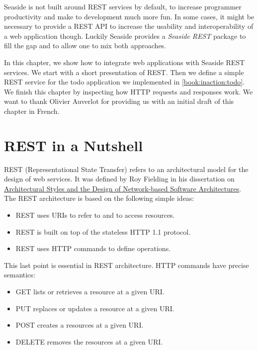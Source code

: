 \documentclass[a4paper,10pt,twoside]{book}
\begin{document}
 Seaside is not built around REST services by default, to increase programmer productivity and make to development much more fun. In some cases, it might be necessary to provide a REST API to increase the usability and interoperability of a web application though. Luckily Seaside provides a \textit{Seaside REST} package to fill the gap and to allow one to mix both approaches.

In this chapter, we show how to integrate web applications with Seaside REST services. We start with a short presentation of REST. Then we define a simple REST service for the todo application we implemented in \autoref{book:inaction:todo}. We finish this chapter by inspecting how HTTP requests and responses work. We want to thank Olivier Auverlot for providing us with an initial draft of this chapter in French.

\section{REST in a Nutshell}
\label{book:advanced:restful:nutshell}

REST (Representational State Transfer) refers to an architectural model for the design of web services. It was defined by Roy Fielding in his dissertation on \href{http://www.ics.uci.edu/~fielding/pubs/dissertation/rest_arch_style.htm}{Architectural Styles and the Design of Network-based Software Architectures}. The REST architecture is based on the following simple ideas:

\begin{itemize}
\item  REST uses URIs to refer to and to access resources.
\item  REST is built on top of the stateless HTTP 1.1 protocol. 
\item  REST uses HTTP commands to define operations.
\end{itemize}

This last point is essential in REST architecture. HTTP commands have precise semantics:

\begin{itemize}
\item  GET lists or retrieves a resource at a given URI. 
\item  PUT replaces or updates a resource at a given URI. 
\item  POST creates a resources at a given URI. 
\item  DELETE removes the resources at a given URI. 
\end{itemize}
\end{document}
